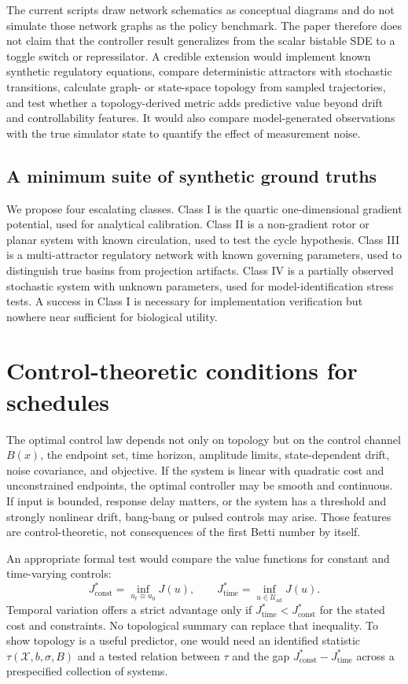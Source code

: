 \documentclass[11pt]{article}
\newcommand{\1}{\mathbf{1}}
\begin{document}
The current scripts draw network schematics as conceptual diagrams and do not simulate those network graphs as the policy benchmark. The paper therefore does not claim that the controller result generalizes from the scalar bistable SDE to a toggle switch or repressilator. A credible extension would implement known synthetic regulatory equations, compare deterministic attractors with stochastic transitions, calculate graph- or state-space topology from sampled trajectories, and test whether a topology-derived metric adds predictive value beyond drift and controllability features. It would also compare model-generated observations with the true simulator state to quantify the effect of measurement noise.

\subsection{A minimum suite of synthetic ground truths}
We propose four escalating classes. Class I is the quartic one-dimensional gradient potential, used for analytical calibration. Class II is a non-gradient rotor or planar system with known circulation, used to test the cycle hypothesis. Class III is a multi-attractor regulatory network with known governing parameters, used to distinguish true basins from projection artifacts. Class IV is a partially observed stochastic system with unknown parameters, used for model-identification stress tests. A success in Class I is necessary for implementation verification but nowhere near sufficient for biological utility.

\section{Control-theoretic conditions for schedules}
The optimal control law depends not only on topology but on the control channel $B(x)$, the endpoint set, time horizon, amplitude limits, state-dependent drift, noise covariance, and objective. If the system is linear with quadratic cost and unconstrained endpoints, the optimal controller may be smooth and continuous. If input is bounded, response delay matters, or the system has a threshold and strongly nonlinear drift, bang-bang or pulsed controls may arise. Those features are control-theoretic, not consequences of the first Betti number by itself.

An appropriate formal test would compare the value functions for constant and time-varying controls:
\begin{equation}
J_{\mathrm{const}}^*=\inf_{u_t\equiv u_0}J(u),\qquad
J_{\mathrm{time}}^*=\inf_{u\in\mathcal{U}_{\mathrm{ad}}}J(u).
\end{equation}
Temporal variation offers a strict advantage only if $J_{\mathrm{time}}^*<J_{\mathrm{const}}^*$ for the stated cost and constraints. No topological summary can replace that inequality. To show topology is a useful predictor, one would need an identified statistic $\tau(\mathcal{X},b,\sigma,B)$ and a tested relation between $\tau$ and the gap $J_{\mathrm{const}}^*-J_{\mathrm{time}}^*$ across a prespecified collection of systems.
\end{document}
